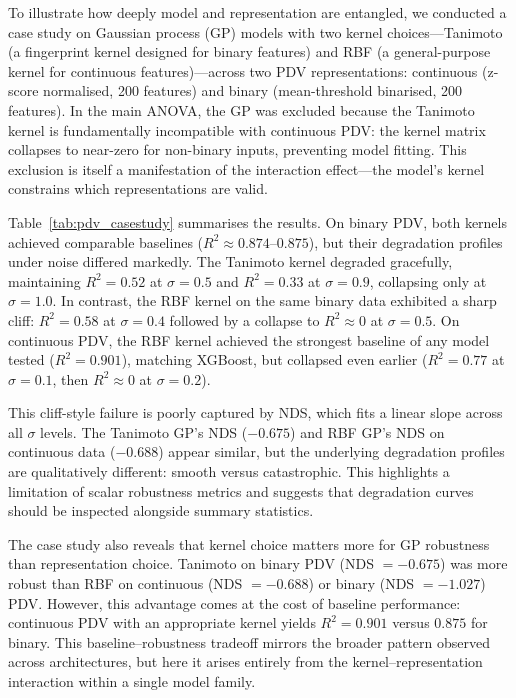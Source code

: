 
\label{sec:pdv_casestudy}
To illustrate how deeply model and representation are entangled, we conducted a case study on Gaussian process (GP) models with two kernel choices---Tanimoto (a fingerprint kernel designed for binary features) and RBF (a general-purpose kernel for continuous features)---across two PDV representations: continuous (z-score normalised, 200 features) and binary (mean-threshold binarised, 200 features). In the main ANOVA, the GP was excluded because the Tanimoto kernel is fundamentally incompatible with continuous PDV: the kernel matrix collapses to near-zero for non-binary inputs, preventing model fitting. This exclusion is itself a manifestation of the interaction effect---the model's kernel constrains which representations are valid.

Table~\ref{tab:pdv_casestudy} summarises the results. On binary PDV, both kernels achieved comparable baselines ($R^2 \approx 0.874$--$0.875$), but their degradation profiles under noise differed markedly. The Tanimoto kernel degraded gracefully, maintaining $R^2 = 0.52$ at $\sigma = 0.5$ and $R^2 = 0.33$ at $\sigma = 0.9$, collapsing only at $\sigma = 1.0$. In contrast, the RBF kernel on the same binary data exhibited a sharp cliff: $R^2 = 0.58$ at $\sigma = 0.4$ followed by a collapse to $R^2 \approx 0$ at $\sigma = 0.5$. On continuous PDV, the RBF kernel achieved the strongest baseline of any model tested ($R^2 = 0.901$), matching XGBoost, but collapsed even earlier ($R^2 = 0.77$ at $\sigma = 0.1$, then $R^2 \approx 0$ at $\sigma = 0.2$).

This cliff-style failure is poorly captured by NDS, which fits a linear slope across all $\sigma$ levels. The Tanimoto GP's NDS ($-0.675$) and RBF GP's NDS on continuous data ($-0.688$) appear similar, but the underlying degradation profiles are qualitatively different: smooth versus catastrophic. This highlights a limitation of scalar robustness metrics and suggests that degradation curves should be inspected alongside summary statistics.

The case study also reveals that kernel choice matters more for GP robustness than representation choice. Tanimoto on binary PDV (NDS $= -0.675$) was more robust than RBF on continuous (NDS $= -0.688$) or binary (NDS $= -1.027$) PDV. However, this advantage comes at the cost of baseline performance: continuous PDV with an appropriate kernel yields $R^2 = 0.901$ versus $0.875$ for binary. This baseline--robustness tradeoff mirrors the broader pattern observed across architectures, but here it arises entirely from the kernel--representation interaction within a single model family.

